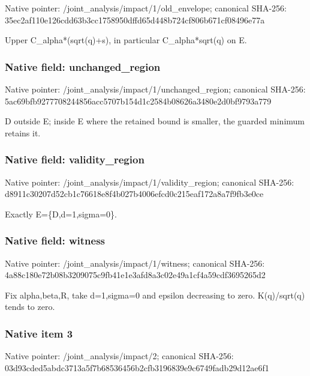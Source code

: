 \documentclass[10pt,a4paper]{article}
\begin{document}
Native pointer: /joint\_analysis/impact/1/old\_envelope; canonical SHA-256: 35ec2af110e126cdd63b3cc1\allowbreak{}758950dffd65d448b724cf80\allowbreak{}6b671cf08496e77a


Upper C\_alpha*(sqrt(q)+s), in particular C\_alpha*sqrt(q) on E.


\subsubsection{Native field: unchanged\_region}


Native pointer: /joint\_analysis/impact/1\allowbreak{}/unchanged\_region; canonical SHA-256: 5ac69bfb9277708244856acc\allowbreak{}5707b154d1c2584b08626a34\allowbreak{}80e2d0bf9793a779


D outside E; inside E where the retained bound is smaller, the guarded minimum retains it.


\subsubsection{Native field: validity\_region}


Native pointer: /joint\_analysis/impact/1\allowbreak{}/validity\_region; canonical SHA-256: d8911c30207d52cb1c76618e\allowbreak{}8f4b027b4006efcd0c215eaf\allowbreak{}172a8a7f9fb3e0ce


Exactly E=\{D,d=1,sigma=0\}.


\subsubsection{Native field: witness}


Native pointer: /joint\_analysis/impact/1/witness; canonical SHA-256: 4a88c180e72b08b3209075c9\allowbreak{}fb41e1e3afd8a3c02e49a1cf\allowbreak{}4a59cdf3695265d2


Fix alpha,beta,R, take d=1,sigma=0 and epsilon decreasing to zero. K(q)/sqrt(q) tends to zero.


\subsubsection{Native item 3}


Native pointer: /joint\_analysis/impact/2; canonical SHA-256: 03d93cded5abdc3713a5f7b6\allowbreak{}8536456b2cfb3196839e9c67\allowbreak{}49fadb29d12ae6f1
\end{document}
